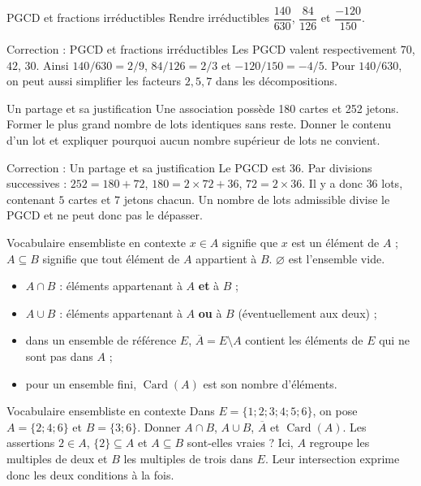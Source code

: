 \documentclass[aspectratio=169,10pt]{beamer}
\providecommand{\Card}{\operatorname{Card}}
\begin{document}
\begin{frame}{PGCD et fractions irréductibles}
Rendre irréductibles \(\dfrac{140}{630}\), \(\dfrac{84}{126}\) et \(\dfrac{-120}{150}\).
\end{frame}
\begin{frame}{Correction : PGCD et fractions irréductibles}
Les PGCD valent respectivement \(70\), \(42\), \(30\). Ainsi \(140/630=2/9\), \(84/126=2/3\) et \(-120/150=-4/5\). Pour \(140/630\), on peut aussi simplifier les facteurs \(2,5,7\) dans les décompositions.
\end{frame}
\begin{frame}{Un partage et sa justification}
Une association possède 180 cartes et 252 jetons. Former le plus grand nombre de lots identiques sans reste. Donner le contenu d’un lot et expliquer pourquoi aucun nombre supérieur de lots ne convient.
\end{frame}
\begin{frame}{Correction : Un partage et sa justification}
Le PGCD est \(36\). Par divisions successives : \(252=180+72\), \(180=2\times72+36\), \(72=2\times36\). Il y a donc \(36\) lots, contenant \(5\) cartes et \(7\) jetons chacun. Un nombre de lots admissible divise le PGCD et ne peut donc pas le dépasser.
\end{frame}
\begin{frame}{Vocabulaire ensembliste en contexte}
\(x\in A\) signifie que \(x\) est un élément de \(A\) ; \(A\subseteq B\) signifie que tout élément de \(A\) appartient à \(B\). \(\varnothing\) est l'ensemble vide.

\begin{itemize}

\item \(A\cap B\) : éléments appartenant à \(A\) \textbf{et} à \(B\) ;

\item \(A\cup B\) : éléments appartenant à \(A\) \textbf{ou} à \(B\) (éventuellement aux deux) ;

\item dans un ensemble de référence \(E\), \(\overline A=E\setminus A\) contient les éléments de \(E\) qui ne sont pas dans \(A\) ;

\item pour un ensemble fini, \(\Card(A)\) est son nombre d'éléments.

\end{itemize}
\end{frame}
\begin{frame}{Vocabulaire ensembliste en contexte}
Dans \(E=\{1;2;3;4;5;6\}\), on pose \(A=\{2;4;6\}\) et \(B=\{3;6\}\). Donner \(A\cap B\), \(A\cup B\), \(\overline A\) et \(\Card(A)\). Les assertions \(2\in A\), \(\{2\}\subseteq A\) et \(A\subseteq B\) sont-elles vraies ? Ici, \(A\) regroupe les multiples de deux et \(B\) les multiples de trois dans \(E\). Leur intersection exprime donc les deux conditions à la fois.
\end{frame}
\end{document}
